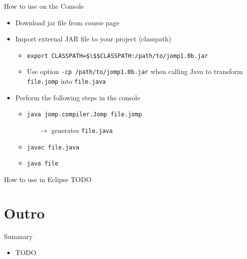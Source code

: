 \begin{frame}{How to use on the Console}
  \begin{itemize}
  \item Download jar file from course page
  \item Import external JAR file to your project (classpath)
    \begin{itemize}
    \item \lstinline!export CLASSPATH=$\$$CLASSPATH:/path/to/jomp1.0b.jar!
    \item Use option \lstinline!-cp /path/to/jomp1.0b.jar! when
      calling Java to transform \lstinline!file.jomp! into
      \lstinline!file.java!
    \end{itemize}
  \item Perform the following steps in the console
    \begin{itemize}
    \item \lstinline!java jomp.compiler.Jomp file.jomp!
      \begin{itemize}
      \item[$\rightarrow$] generates \lstinline!file.java!
      \end{itemize}
    \item \lstinline!javac file.java!
    \item \lstinline!java file!
    \end{itemize}
  \end{itemize}
\end{frame}

\begin{frame}{How to use in Eclipse}
  TODO
\end{frame}


\section*{Outro}

\begin{frame}{Summary}
  \begin{itemize}
  \item TODO
  \end{itemize}
\end{frame}


